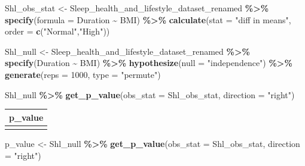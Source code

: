 \documentclass[
  11pt,
]{article}
\newenvironment{Shaded}{\begin{snugshade}}{\end{snugshade}}
\newcommand{\AttributeTok}[1]{\textcolor[rgb]{0.13,0.29,0.53}{#1}}
\newcommand{\DecValTok}[1]{\textcolor[rgb]{0.00,0.00,0.81}{#1}}
\newcommand{\FunctionTok}[1]{\textcolor[rgb]{0.13,0.29,0.53}{\textbf{#1}}}
\newcommand{\NormalTok}[1]{#1}
\newcommand{\OtherTok}[1]{\textcolor[rgb]{0.56,0.35,0.01}{#1}}
\newcommand{\SpecialCharTok}[1]{\textcolor[rgb]{0.81,0.36,0.00}{\textbf{#1}}}
\newcommand{\StringTok}[1]{\textcolor[rgb]{0.31,0.60,0.02}{#1}}
\begin{document}
\begin{Shaded}
\begin{Highlighting}[]
\NormalTok{Shl\_obs\_stat }\OtherTok{\textless{}{-}}
\NormalTok{  Sleep\_health\_and\_lifestyle\_dataset\_renamed }\SpecialCharTok{\%\textgreater{}\%}
  \FunctionTok{specify}\NormalTok{(}\AttributeTok{formula =}\NormalTok{ Duration }\SpecialCharTok{\textasciitilde{}}\NormalTok{ BMI) }\SpecialCharTok{\%\textgreater{}\%}
  \FunctionTok{calculate}\NormalTok{(}\AttributeTok{stat =} \StringTok{"diff in means"}\NormalTok{, }\AttributeTok{order =} \FunctionTok{c}\NormalTok{(}\StringTok{"Normal"}\NormalTok{,}\StringTok{"High"}\NormalTok{))}
\end{Highlighting}
\end{Shaded}

\begin{Shaded}
\begin{Highlighting}[]
\NormalTok{Shl\_null }\OtherTok{\textless{}{-}}\NormalTok{ Sleep\_health\_and\_lifestyle\_dataset\_renamed }\SpecialCharTok{\%\textgreater{}\%}
  \FunctionTok{specify}\NormalTok{(Duration }\SpecialCharTok{\textasciitilde{}}\NormalTok{ BMI) }\SpecialCharTok{\%\textgreater{}\%}
  \FunctionTok{hypothesize}\NormalTok{(}\AttributeTok{null =} \StringTok{"independence"}\NormalTok{) }\SpecialCharTok{\%\textgreater{}\%}
  \FunctionTok{generate}\NormalTok{(}\AttributeTok{reps =} \DecValTok{1000}\NormalTok{, }\AttributeTok{type =} \StringTok{"permute"}\NormalTok{)}
\end{Highlighting}
\end{Shaded}

\begin{Shaded}
\begin{Highlighting}[]
\NormalTok{Shl\_null }\SpecialCharTok{\%\textgreater{}\%} \FunctionTok{get\_p\_value}\NormalTok{(}\AttributeTok{obs\_stat =}\NormalTok{ Shl\_obs\_stat, }\AttributeTok{direction =} \StringTok{"right"}\NormalTok{)}
\end{Highlighting}
\end{Shaded}

\begin{longtable}[]{@{}r@{}}
\toprule\noalign{}
p\_value \\
\midrule\noalign{}
\endhead
\bottomrule\noalign{}
\endlastfoot
1 \\
\end{longtable}

\begin{Shaded}
\begin{Highlighting}[]
\NormalTok{p\_value }\OtherTok{\textless{}{-}}\NormalTok{ Shl\_null }\SpecialCharTok{\%\textgreater{}\%} \FunctionTok{get\_p\_value}\NormalTok{(}\AttributeTok{obs\_stat =}\NormalTok{ Shl\_obs\_stat, }\AttributeTok{direction =} \StringTok{"right"}\NormalTok{)}
\end{Highlighting}
\end{Shaded}
\end{document}
